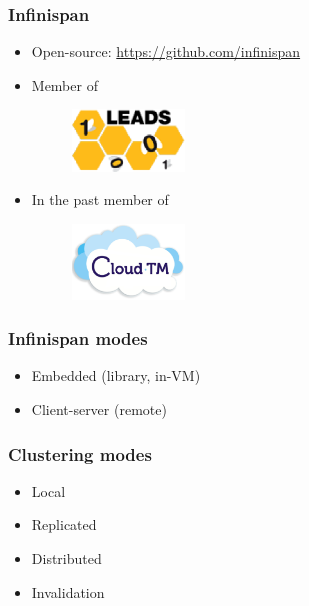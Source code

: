 \documentclass[10pt,utf8]{beamer}
\begin{document}
\begin{frame}
	\frametitle{Infinispan}
	\begin{itemize}
		\item Open-source: \url{https://github.com/infinispan}
		\item Member of
			\begin{figure}
				\centering
				\includegraphics[width=3cm]{./img/leads.eps}
			\end{figure}
			\vspace{0.5cm}
		\item In the past member of
			\begin{figure}
				\centering
				\includegraphics[width=3cm]{./img/cloudTM.eps}
			\end{figure}
	\end{itemize}
\end{frame}

\begin{frame}
  \frametitle{Infinispan modes}
  \begin{itemize}
    \item Embedded (library, in-VM)
		\item Client-server (remote)
  \end{itemize}
\end{frame}

\begin{frame}
  \frametitle{Clustering modes}
  \begin{itemize}
    \item Local
		\item Replicated
		\item Distributed
		\item Invalidation
  \end{itemize}
\end{frame}
\end{document}
